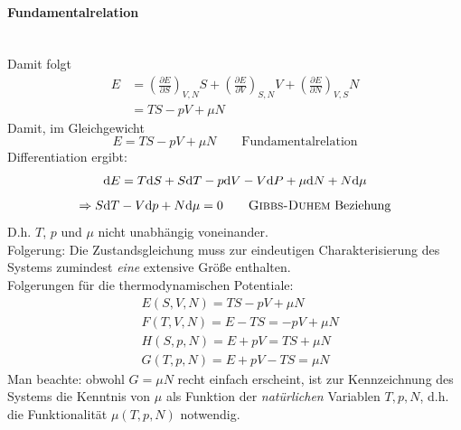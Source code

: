 \paragraph{Fundamentalrelation}\mbox{}\\
Damit folgt
\begin{equation}
    \begin{split}
        E &= \left( \frac{\partial E}{\partial S} \right)_{V, N} S + \left( \frac{\partial E}{\partial V} \right)_{S, N} V + \left( \frac{\partial E}{\partial N} \right)_{V, S} N \\
        &= T S - p V + \mu N
    \end{split}
\end{equation}
Damit, im Gleichgewicht
\begin{equation}
    E = T S - p V + \mu N \qquad \text{Fundamentalrelation}
\end{equation}
Differentiation ergibt:
\begin{equation}
    \mathrm{d} E = T \mathrm{d} S + S \mathrm{d} T - p \mathrm{d} V - V \mathrm{d} P + \mu \mathrm{d} N + N \mathrm{d} \mu
\end{equation}
\begin{equation}
    \Rightarrow S \mathrm{d} T - V \mathrm{d} p + N \mathrm{d} \mu = 0 \qquad \text{\textsc{Gibbs-Duhem} Beziehung}
\end{equation}
D.h. $T$, $p$ und $\mu$ nicht unabhängig voneinander. \\
Folgerung: Die Zustandsgleichung muss zur eindeutigen Charakterisierung des Systems zumindest \emph{eine} extensive Größe enthalten. \\
Folgerungen für die thermodynamischen Potentiale:
\begin{equation}
    \begin{split}
        & E(S, V, N) = T S - p V + \mu N \\
        & F(T, V, N) = E - TS = - pV + \mu N \\
        & H(S, p, N) = E + p V = T S + \mu N \\
        & G(T, p, N) = E + p V - T S = \mu N
    \end{split}
\end{equation}
Man beachte: obwohl $G=\mu N$ recht einfach erscheint, ist zur Kennzeichnung des Systems die Kenntnis von $\mu$ als Funktion der \emph{natürlichen}
Variablen $T, p, N$, d.h. die Funktionalität $\mu(T, p, N)$ notwendig.

